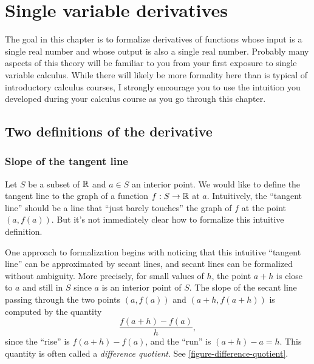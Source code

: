 \chapter{Single variable derivatives} \label{single}

The goal in this chapter is to formalize derivatives of functions whose input is a single real number and whose output is also a single real number. Probably many aspects of this theory will be familiar to you from your first exposure to single variable calculus. While there will likely be more formality here than is typical of introductory calculus courses, I strongly encourage you to use the intuition you developed during your calculus course as you go through this chapter. 

\section{Two definitions of the derivative}

\subsection{Slope of the tangent line}

Let $S$ be a subset of $\mathbb{R}$ and $a \in S$ an interior point. We would like to define the tangent line to the graph of a function $f : S \to \mathbb{R}$ at $a$. Intuitively, the ``tangent line'' should be a line that ``just barely touches'' the graph of $f$ at the point $(a, f(a))$. But it's not immediately clear how to formalize this intuitive definition.  

One approach to formalization begins with noticing that this intuitive ``tangent line'' can be approximated by secant lines, and secant lines can be formalized without ambiguity. More precisely, for small values of $h$, the point $a+h$ is close to $a$ and still in $S$ since $a$ is an interior point of $S$. The slope of the secant line passing through the two points $(a, f(a))$ and $(a+h, f(a+h))$ is computed by the quantity
\[ \frac{f(a+h)-f(a)}{h}, \]
since the ``rise'' is $f(a+h)-f(a)$, and the ``run'' is $(a+h)-a = h$. This quantity is often called a \emph{difference quotient}. See \cref{figure-difference-quotient}. 

